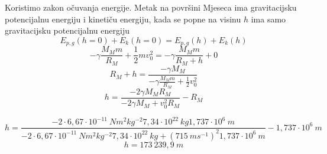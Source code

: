 


Koristimo zakon očuvanja energije. Metak na površini Mjeseca ima gravitacijsku potencijalnu energiju i kinetiču energiju, 
kada se popne na visinu $h$ ima samo gravitacijsku potencijalnu energiju
$$ E_{p,g}(h=0) +  E_k(h=0) = E_{p,g}(h) +  E_k(h) $$
$$ -\gamma\frac{M_Mm}{R_M} + \frac{1}{2}mv_0^2  =  -\gamma\frac{M_Mm}{R_M+h} + 0 $$
$$ R_M+h = \frac{-\gamma M_M}{-\gamma\frac{M_Mm}{R_M} + \frac{1}{2}v_0^2  } $$
$$ h = \frac{ -2\gamma M_M R_M}{-2\gamma M_M + v_0^2R_M} - R_M  $$

$$ h = \frac{ -2\cdot6,67\cdot  10^{-11}\ Nm^2kg^{-2}   7,34\cdot10^{22}\ kg 1,737\cdot10^6\ m}
{-2\cdot6,67\cdot  10^{-11}\ Nm^2kg^{-2} 7,34\cdot10^{22}\ kg + (715\ ms^{-1})^2  1,737\cdot10^6\ m} - 1,737\cdot10^6\ m  $$
$$ h=173\ 239,9\  m  $$
